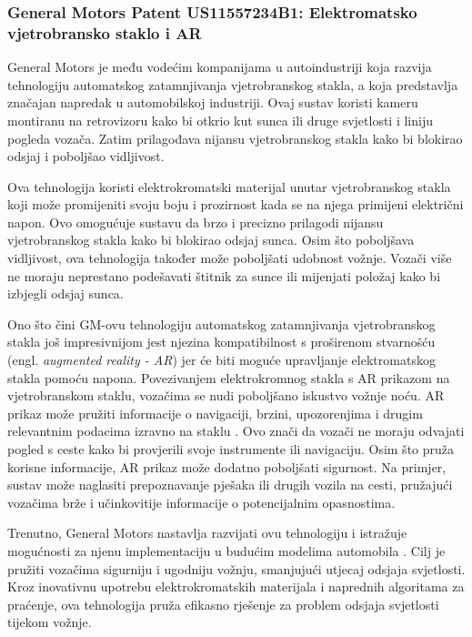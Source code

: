 \documentclass{foi}
\begin{document}
\subsubsection{General Motors Patent US11557234B1: Elektromatsko vjetrobransko staklo i AR}

General Motors je među vodećim kompanijama u autoindustriji \cite{GeneralMotors} koja razvija tehnologiju automatskog zatamnjivanja vjetrobranskog stakla, a koja predstavlja značajan napredak u automobilskoj industriji. Ovaj sustav koristi kameru montiranu na retrovizoru kako bi otkrio kut sunca ili druge svjetlosti i liniju pogleda vozača. Zatim prilagođava nijansu vjetrobranskog stakla kako bi blokirao odsjaj i poboljšao vidljivost. \cite{GeneralMotors2022}

Ova tehnologija koristi elektrokromatski materijal unutar vjetrobranskog stakla koji može promijeniti svoju boju i prozirnost kada se na njega primijeni električni napon. Ovo omogućuje sustavu da brzo i precizno prilagodi nijansu vjetrobranskog stakla kako bi blokirao odsjaj sunca. Osim što poboljšava vidljivost, ova tehnologija također može poboljšati udobnost vožnje. Vozači više ne moraju neprestano podešavati štitnik za sunce ili mijenjati položaj kako bi izbjegli odsjaj sunca. \cite{Bogdan2023}

\newpage
Ono što čini GM-ovu tehnologiju automatskog zatamnjivanja vjetrobranskog stakla još impresivnijom jest njezina kompatibilnost s proširenom stvarnošću (engl. \emph{augmented reality - AR}) jer će biti moguće upravljanje elektromatskog stakla pomoću napona. Povezivanjem elektrokromnog stakla s AR prikazom na vjetrobranskom staklu, vozačima se nudi poboljšano iskustvo vožnje noću. AR prikaz može pružiti informacije o navigaciji, brzini, upozorenjima i drugim relevantnim podacima izravno na staklu \cite{TudoseSergiu2022}. Ovo znači da vozači ne moraju odvajati pogled s ceste kako bi provjerili svoje instrumente ili navigaciju. Osim što pruža korisne informacije, AR prikaz može dodatno poboljšati sigurnost. Na primjer, sustav može naglasiti prepoznavanje pješaka ili drugih vozila na cesti, pružajući vozačima brže i učinkovitije informacije o potencijalnim opasnostima. \cite{Bogdan2023} \cite{GeneralMotors2022}

Trenutno, General Motors nastavlja razvijati ovu tehnologiju i istražuje mogućnosti za njenu implementaciju u budućim modelima automobila \cite{Bogdan2023}. Cilj je pružiti vozačima sigurniju i ugodniju vožnju, smanjujući utjecaj odsjaja svjetlosti. Kroz inovativnu upotrebu elektrokromatskih materijala i naprednih algoritama za praćenje, ova tehnologija pruža efikasno rješenje za problem odsjaja svjetlosti tijekom vožnje.
\end{document}
